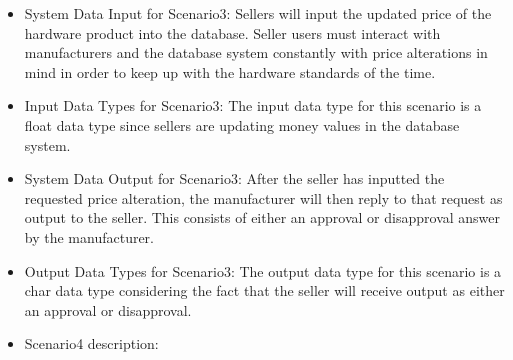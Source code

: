 {\begin{itemize}
\begin{itemize}
\begin{itemize}
	There are multiple real world scenarios a seller user type can act out within the database environment. For example: A seller user type can submit a request to update price information on a computer hardware product in their inventory. The seller will then receive approval or disapproval from the manufacturer, deciding whether or not the requested price alteration can be accepted. Product standards are constantly being updated and improved as new merchandise is released each year. With such adjustments, constant alteration in price is required to keep customer satisfaction at a high rate. Sellers cannot afford the risk of keeping product prices static. A lack of constant updating of price information can lead retailers loosing sales and future customers. Additionally, negative customer reviews can erupt from such an occurrence that can most definitely impact both the seller and manufacturer for the worst. Such a scenario is very typical amongst these two user types and should be accommodated for in the computer hardware database. Overall, the interaction between seller and manufacture is necessary when regarding price modifications that ultimately can lead to a beneficial relationship between the two when sharing a database system.
	\item{System Data Input for Scenario3: }
	Sellers will input the updated price of the hardware product into the database. Seller users must interact with manufacturers and the database system constantly with price alterations in mind in order to keep up with the hardware standards of the time. 
	\item{Input Data Types for Scenario3: }
	The input data type for this scenario is a float data type since sellers are updating money values in the database system. 
	\item{System Data Output for Scenario3: }
	After the seller has inputted the requested price alteration, the manufacturer will then reply to that request as output to the seller. This consists of either an approval or disapproval answer by the manufacturer. 
	\item{Output Data Types for Scenario3: }
	The output data type for this scenario is a char data type considering the fact that the seller will receive output as either an approval or disapproval. 
	\end{itemize}
	\begin{itemize} 
	\item{Scenario4 description: }

\end{itemize}
\end{itemize}
\end{itemize}}
